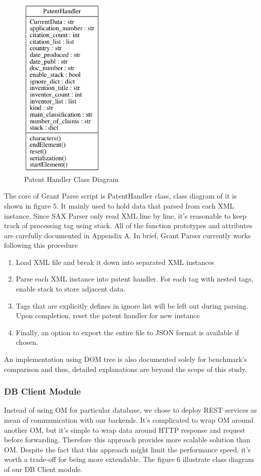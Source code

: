 \documentclass{sig-alternate}
\begin{document}
{\begin{figure}[htb]
\centering
\includegraphics[width=40mm,scale=10]{handler.png}
\caption{ Patent Handler Class Diagram}
\end{figure}

The core of Grant Parse script is PatentHandler class, class diagram of it is shown in figure 5. It mainly used to hold data that parsed from each XML instance. Since SAX Parser only read XML line by line, it's reasonable to keep track of processing tag using stack. All of the function prototypes and attributes are carefully documented in Appendix A. In brief, Grant Parser currently works following this procedure
\begin{enumerate}
 \item Load XML file and break it down into separated XML instances
 \item Parse each XML instance into patent handler. For each tag with nested tags, enable stack to store adjacent data.
 \item Tags that are explicitly defines in ignore list will be left out during parsing. Upon completion, reset the patent handler for new instance
 \item Finally, an option to export the entire file to JSON format is available if chosen.
\end{enumerate}

An implementation using DOM tree is also documented solely for benchmark's comparison and thus, detailed explanations are beyond the scope of this study.

\subsubsection{DB Client Module}
Instead of using OM for particular database, we chose to deploy REST services as mean of communication with our backends. It's complicated to wrap OM around another OM, but it's simple to wrap data around HTTP response and request before forwarding. Therefore this approach provides more scalable solution than OM. Despite the fact that this approach might limit the performance speed, it's worth a trade-off for being more extendable. The figure 6 illustrate class diagram of our DB Client module.

}
\end{document}
